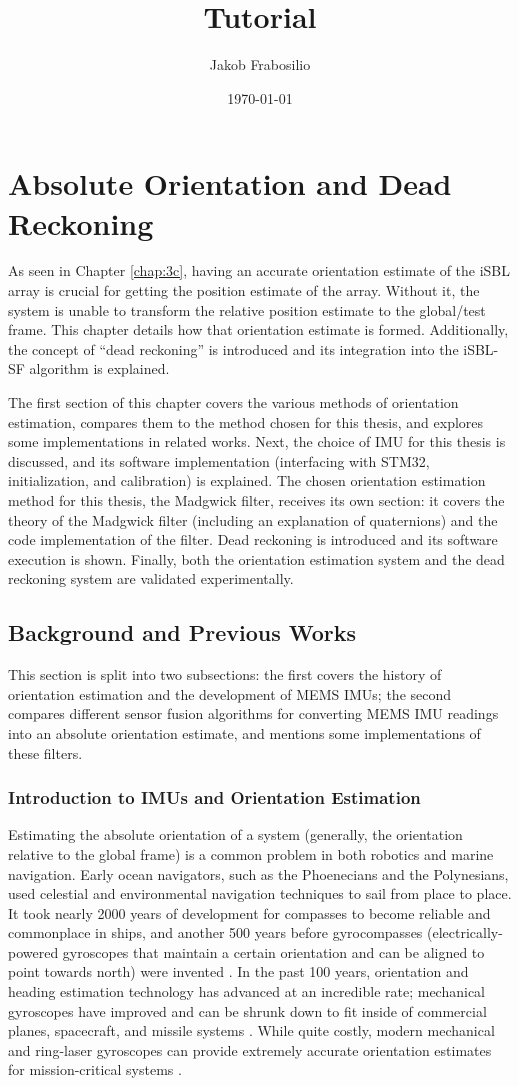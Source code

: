 \documentclass[12pt,a4paper]{report}
\title{Tutorial}
\author{Jakob Frabosilio}
\date{\today}
\begin{document}
\chapter{Absolute Orientation and Dead Reckoning} \label{chap:4c}
As seen in Chapter \ref{chap:3c}, having an accurate orientation estimate of the iSBL array is crucial for getting the position estimate of the array. Without it, the system is unable to transform the relative position estimate to the global/test frame. This chapter details how that orientation estimate is formed. Additionally, the concept of “dead reckoning” is introduced and its integration into the iSBL-SF algorithm is explained.

The first section of this chapter covers the various methods of orientation estimation, compares them to the method chosen for this thesis, and explores some implementations in related works. Next, the choice of IMU for this thesis is discussed, and its software implementation (interfacing with STM32, initialization, and calibration) is explained. The chosen orientation estimation method for this thesis, the Madgwick filter, receives its own section: it covers the theory of the Madgwick filter (including an explanation of quaternions) and the code implementation of the filter. Dead reckoning is introduced and its software execution is shown. Finally, both the orientation estimation system and the dead reckoning system are validated experimentally.

\section{Background and Previous Works} \label{sec:4s1}
This section is split into two subsections: the first covers the history of orientation estimation and the development of MEMS IMUs; the second compares different sensor fusion algorithms for converting MEMS IMU readings into an absolute orientation estimate, and mentions some implementations of these filters.

\subsection{Introduction to IMUs and Orientation Estimation} \label{ssec:4s1s1}
Estimating the absolute orientation of a system (generally, the orientation relative to the global frame) is a common problem in both robotics and marine navigation. Early ocean navigators, such as the Phoenecians and the Polynesians, used celestial and environmental navigation techniques to sail from place to place. It took nearly 2000 years of development for compasses to become reliable and commonplace in ships, and another 500 years before gyrocompasses (electrically-powered gyroscopes that maintain a certain orientation and can be aligned to point towards north) were invented \cite{shipscompass}. In the past 100 years, orientation and heading estimation technology has advanced at an incredible rate; mechanical gyroscopes have improved and can be shrunk down to fit inside of commercial planes, spacecraft, and missile systems \cite{v2missile}. While quite costly, modern mechanical and ring-laser gyroscopes can provide extremely accurate orientation estimates for mission-critical systems \cite{shipscompass}.
\end{document}

